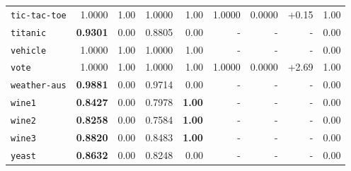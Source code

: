 \begin{tabular}{lrrrrrrrr}
\texttt{tic-tac-toe} & 1.0000 & 1.00 & 1.0000 & 1.00 & 1.0000 & 0.0000 & +0.15 & 1.00\\
\texttt{titanic} & \textbf{0.9301} & 0.00 & 0.8805 & 0.00 & - & - & - & 0.00\\
\texttt{vehicle} & 1.0000 & 1.00 & 1.0000 & 1.00 & - & - & - & 0.00\\
\texttt{vote} & 1.0000 & 1.00 & 1.0000 & 1.00 & 1.0000 & 0.0000 & +2.69 & 1.00\\
\texttt{weather-aus} & \textbf{0.9881} & 0.00 & 0.9714 & 0.00 & - & - & - & 0.00\\
\texttt{wine1} & \textbf{0.8427} & 0.00 & 0.7978 & \textbf{1.00} & - & - & - & 0.00\\
\texttt{wine2} & \textbf{0.8258} & 0.00 & 0.7584 & \textbf{1.00} & - & - & - & 0.00\\
\texttt{wine3} & \textbf{0.8820} & 0.00 & 0.8483 & \textbf{1.00} & - & - & - & 0.00\\
\texttt{yeast} & \textbf{0.8632} & 0.00 & 0.8248 & 0.00 & - & - & - & 0.00\\
\bottomrule
\end{tabular}
